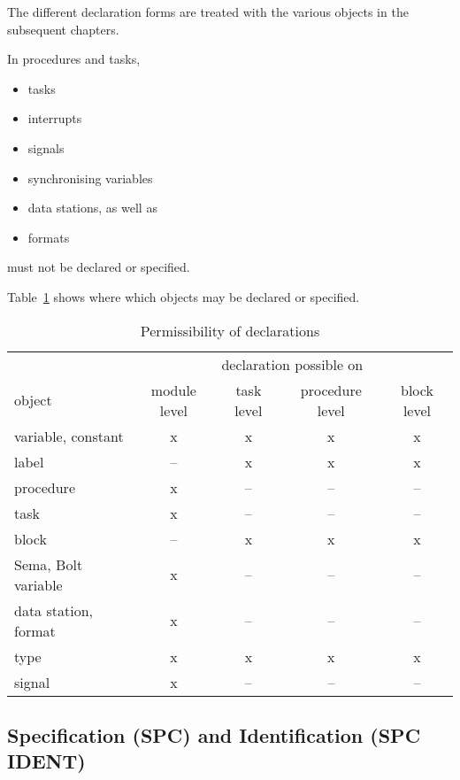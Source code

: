 The different declaration forms are treated with the various objects in
the subsequent chapters.

In procedures and tasks,
\begin{itemize}
\item tasks
\item interrupts
\item signals
\item synchronising variables
\item data stations, as well as
\item formats
\end{itemize}
must not be declared or specified.

Table~\ref{objekte} shows where which objects may be declared or
specified.

\begin{table}
\caption{Permissibility of declarations\label{objekte}}
\vspace{5mm}

\begin{tabular}{|l|c|c|c|c|}
\hline
                       & \multicolumn{4}{|c|}{declaration possible on} \\
object                 & module level & task level & procedure level & block level \\ \hline
variable, constant     & x            & x    & x         & x  \\
label                  & --           & x    & x         & x  \\
procedure              & x            & --    & --         & -- \\
task                   & x            & --   & --        & -- \\
block                  & --           & x    & x         & x  \\
Sema, Bolt variable    & x            & --   & --        & -- \\
data station, format   & x            & --   & --        & -- \\
type                   & x            & x    & x         & x \\
signal                 & x            & --   & --        & -- \\ 
\hline
\end{tabular}
\end{table}

\subsection{Specification (SPC) and Identification (SPC IDENT)}  %

